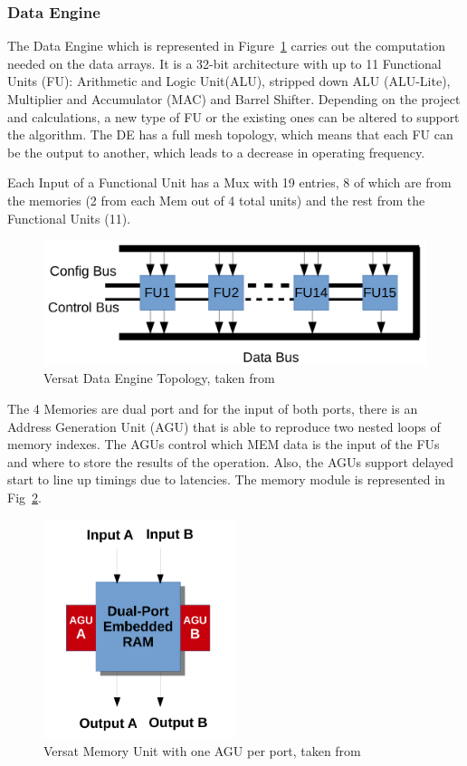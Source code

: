 \subsubsection{Data Engine}
\quad The Data Engine which is represented in Figure~\ref{figure:DE} carries out the computation needed on the data arrays. It is a 32-bit architecture with up to 11 Functional Units (FU):
 Arithmetic and Logic Unit(ALU), stripped down ALU (ALU-Lite),
 Multiplier and Accumulator (MAC) and Barrel Shifter.
 Depending on the project and calculations, a new type of FU or the existing ones can be altered to support the algorithm.
 The DE has a full mesh topology, which means that each FU can be the output to another, which leads to a decrease in operating frequency.

 Each Input of a Functional Unit has a Mux with 19 entries, 8 of which are from the memories (2 from each Mem out of 4 total units) and the rest from the Functional Units (11).

 \begin{figure}[!htbp]
    \centering
    \includegraphics[width=1\textwidth]{Figures/de.png}
    \caption{Versat Data Engine Topology, taken from~\cite{sousa:FFT}}
    \label{figure:DE}
\end{figure} 

 The 4 Memories are dual port and for the input of both ports, 
 there is an Address Generation Unit (AGU) that is able to 
 reproduce two nested loops of memory indexes.
 The AGUs control which MEM data is the input of the FUs and where
 to store the results of the operation. Also, the AGUs support delayed start to line up timings
due to latencies. The memory module is represented in Fig~\ref{figure:FU}.

\begin{figure}[!htbp]
    \centering
    \includegraphics[width=0.5\textwidth]{Figures/fu2.pdf}
    \caption{Versat Memory Unit with one AGU per port, taken from~\cite{lopes:Versat}}
    \label{figure:FU}
\end{figure} 


